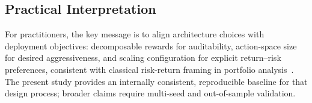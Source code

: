\subsection{Practical Interpretation}
For practitioners, the key message is to align architecture choices with deployment objectives: decomposable rewards for auditability, action-space size for desired aggressiveness, and scaling configuration for explicit return--risk preferences, consistent with classical risk-return framing in portfolio analysis~\citep{markowitz1952portfolio}. The present study provides an internally consistent, reproducible baseline for that design process; broader claims require multi-seed and out-of-sample validation.
